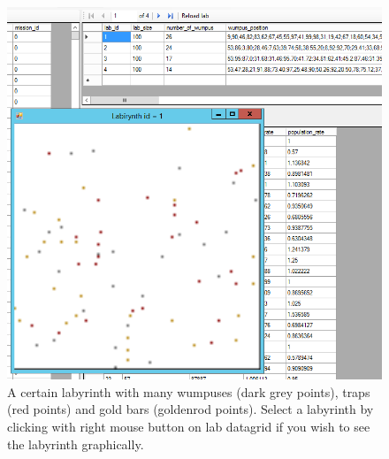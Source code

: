 \documentclass[a4paper,12pt]{article}
\begin{document}
\begin{figure}
	\begin{center}
		\includegraphics[width=15cm]{labrightclick.png}
		\caption{A certain labyrinth with many wumpuses (dark grey points), traps (red points) and gold bars (goldenrod points). Select a labyrinth by clicking with right mouse button on lab datagrid if you wish to see the labyrinth graphically.}
		\label{fig:labrightclick}
	\end{center}
\end{figure}
\end{document}
